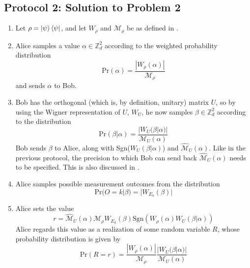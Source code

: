 \documentclass[../3Wworkreport.tex]{subfiles}
\begin{document}
\newpage
\subsection{Protocol 2: Solution to Problem 2}
\label{app:protocol2}
\begin{enumerate}
	\item
		Let $\rho = \ket{\psi}\bra{\psi}$, and let $W_\rho$ and $\mathcal{M}_\rho$ be as defined in .
	\item
		Alice samples a value $\alpha \in \mathbb{Z}_d^2$ according to the weighted probability distribution 
		\begin{equation}
			\text{Pr}(\alpha) = \frac{|W_\rho(\alpha)|}{\mathcal{M}_\rho}
		\end{equation}
		and sends $\alpha$ to Bob.

	\item
		Bob has the orthogonal (which is, by definition, unitary) matrix $U$, so by using the Wigner representation of $U$, $W_U$, he now samples $\beta \in \mathbb{Z}_d^2$ according to the distribution
		\begin{equation}
			\text{Pr}(\beta|\alpha) = \frac{|W_U(\beta|\alpha)|}{\mathcal{M}_U(\alpha)}
		\end{equation}
		Bob sends $\beta$ to Alice, along with Sgn($W_U(\beta|\alpha)$) and $\hat{\mathcal{M}}_U(\alpha)$. Like in the previous protocol, the precision to which Bob can send back $\hat{\mathcal{M}}_U(\alpha)$ needs to be specified. This is also discussed in .

	\item
		Alice samples possible measurement outcomes from the distribution
		\begin{equation}
			\text{Pr}(O = k | \beta) = |W_{E_k}(\beta)|
		\end{equation}

	 \item
		Alice sets the value
		\begin{equation}
			r = \hat{\mathcal{M}}_U(\alpha) \mathcal{M}_\rho W_{E_k}(\beta) \text{Sgn}(W_\rho(\alpha) W_U(\beta|\alpha))
		\end{equation}
		Alice regards this value as a realization of some random variable $R$, whose probability distribution is given by
		\begin{equation}
			\text{Pr}(R = r) = \frac{|W_\rho(\alpha)|}{\mathcal{M}_\rho} \frac{|W_U(\beta|\alpha)|}{\mathcal{M}_U(\alpha)}
		\end{equation}


\end{enumerate}
\end{document}

